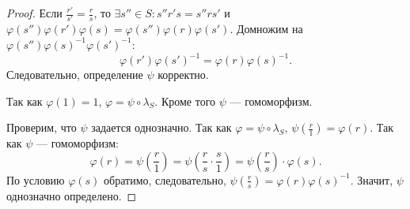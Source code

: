 \documentclass[11pt]{book}
\theoremstyle{definition}
\theoremstyle{plain}
\theoremstyle{plain}
\theoremstyle{definition}
\theoremstyle{remark}
\begin{document}
\begin{proof}
     Если $ \frac{r'}{s'} = \frac{r}{s}$, то $ \exists s'' \in S: s''r's = s''rs'$ и $ \varphi (s'')\varphi(r')\varphi(s) = \varphi (s'') \varphi (r) \varphi (s')$. Домножим на $ \varphi (s'') \varphi (s)^{-1} \varphi (s')^{-1}$:
     \[
	 \varphi (r') \varphi (s')^{-1} = \varphi (r) \varphi (s)^{-1}
     .\] 
     Следовательно, определение $ \psi$ корректно.

     Так как  $ \varphi (1) = 1$, $ \varphi = \psi \circ \lambda_S$. 
     Кроме того $ \psi$ --- гомоморфизм.

     Проверим, что  $ \psi$ задается однозначно.
     Так как $ \varphi = \psi \circ \lambda_S$, $ \psi(\frac{r}{1}) = \varphi (r)$. Так как $ \psi$ --- гомоморфизм:
      \[
	  \varphi (r) = \psi\left( \frac{r}{1} \right) = \psi\left( \frac{r}{s} \cdot \frac{s}{1} \right)   = \psi\left( \frac{r}{s} \right)\cdot \varphi (s) 
     .\] 
     По условию $ \varphi (s)$ обратимо, следовательно, $ \psi(\frac{r}{s}) =  \varphi (r) \varphi (s)^{-1}$. Значит, $ \psi$ однозначно определено.
\end{proof}
\end{document}
